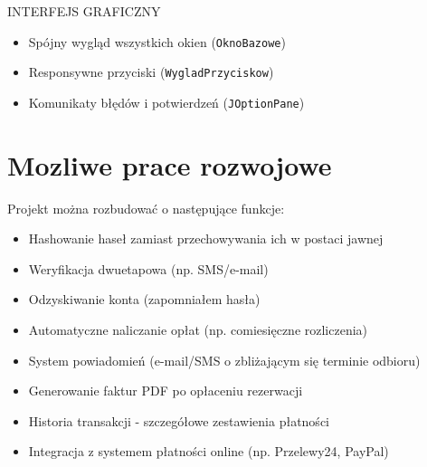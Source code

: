 INTERFEJS GRAFICZNY
\begin{itemize}
\item Spójny wygląd wszystkich okien (\texttt{OknoBazowe})
\item Responsywne przyciski (\texttt{WygladPrzyciskow})
\item Komunikaty błędów i potwierdzeń (\texttt{JOptionPane})
\end{itemize}

\section{Mozliwe prace rozwojowe}
\label{sec:Mozliwe prace rozwojowe}
Projekt można rozbudować o następujące funkcje:

\begin{itemize}
\item Hashowanie haseł zamiast przechowywania ich w postaci jawnej
\item Weryfikacja dwuetapowa (np. SMS/e-mail)
\item Odzyskiwanie konta (zapomniałem hasła)
\item Automatyczne naliczanie opłat (np. comiesięczne rozliczenia)
\item System powiadomień (e-mail/SMS o zbliżającym się terminie odbioru)
\item Generowanie faktur PDF po opłaceniu rezerwacji
\item Historia transakcji - szczegółowe zestawienia płatności
\item Integracja z systemem płatności online (np. Przelewy24, PayPal)
\end{itemize}
